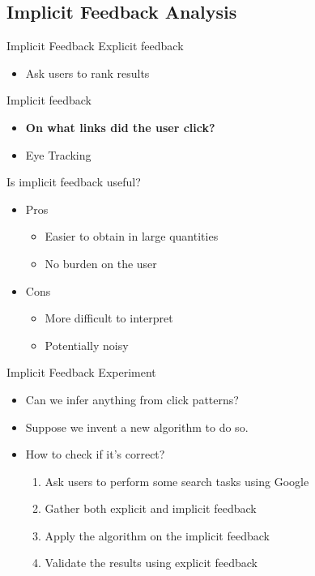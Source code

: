 \subsection{Implicit Feedback Analysis}

\begin{frame}{Implicit Feedback}
  Explicit feedback
  \begin{itemize}
  \item Ask users to rank results
  \end{itemize}

  Implicit feedback
  \begin{itemize}
  \item \textbf{On what links did the user click?}
  \item Eye Tracking
  \end{itemize}


  Is implicit feedback useful?
  \begin{itemize}
  \item Pros
    \begin{itemize}
    \item Easier to obtain in large quantities
    \item No burden on the user
    \end{itemize}
  \item Cons
    \begin{itemize}
    \item More difficult to interpret
    \item Potentially noisy
    \end{itemize}
  \end{itemize}
\end{frame}

\begin{frame}{Implicit Feedback Experiment}
  \begin{itemize}
  \item Can we infer anything from click patterns? \newline
  \item Suppose we invent a new algorithm to do so. \newline
  \item How to check if it's correct? \newline
    \begin{enumerate}
    \item Ask users to perform some search tasks using Google
    \item Gather both explicit and implicit feedback
    \item Apply the algorithm on the implicit feedback
    \item Validate the results using explicit feedback
    \end{enumerate}
  \end{itemize}
\end{frame}

